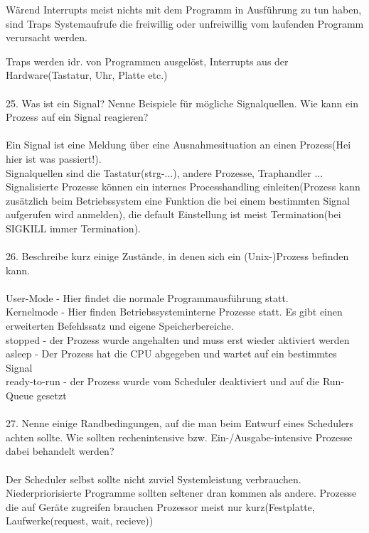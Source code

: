 \documentclass{article}
\begin{document}
W\"arend Interrupts meist nichts mit dem Programm in Ausf\"uhrung zu tun haben, sind Traps Systemaufrufe die freiwillig oder unfreiwillig vom laufenden Programm verursacht werden.

Traps werden idr. von Programmen ausgel\"ost, Interrupts aus der Hardware(Tastatur, Uhr, Platte etc.)
\\
\\
25. Was ist ein Signal? Nenne Beispiele für mögliche Signalquellen. Wie kann ein Prozess auf
ein Signal reagieren?
\\
\\
Ein Signal ist eine Meldung \"uber eine Ausnahmesituation an einen Prozess(Hei hier ist was passiert!).\\
Signalquellen sind die Tastatur(strg-...), andere Prozesse, Traphandler ...\\
Signalisierte Prozesse k\"onnen ein internes Processhandling einleiten(Prozess kann zus\"atzlich beim Betriebssystem eine Funktion die bei einem bestimmten Signal aufgerufen wird anmelden), die default Einstellung ist meist Termination(bei SIGKILL immer Termination).
\\
\\
26. Beschreibe kurz einige Zustände, in denen sich ein (Unix-)Prozess befinden kann.
\\
\\
User-Mode - Hier findet die normale Programmausf\"uhrung statt.\\
Kernelmode - Hier finden Betriebssysteminterne Prozesse statt. Es gibt einen erweiterten Befehlssatz und eigene Speicherbereiche.\\
stopped - der Prozess wurde angehalten und muss erst wieder aktiviert werden\\
asleep - Der Prozess hat die CPU abgegeben und wartet auf ein bestimmtes Signal\\
ready-to-run - der Prozess wurde vom Scheduler deaktiviert und auf die Run- Queue gesetzt
\\
\\
27. Nenne einige Randbedingungen, auf die man beim Entwurf eines Schedulers achten sollte.
Wie sollten rechenintensive bzw. Ein-/Ausgabe-intensive Prozesse dabei behandelt werden?
\\
\\
Der Scheduler selbst sollte nicht zuviel Systemleistung verbrauchen.
Niederpriorisierte Programme sollten seltener dran kommen als andere.
Prozesse die auf Ger\"ate zugreifen brauchen Prozessor meist nur kurz(Festplatte, Laufwerke(request, wait, recieve))
\end{document}
